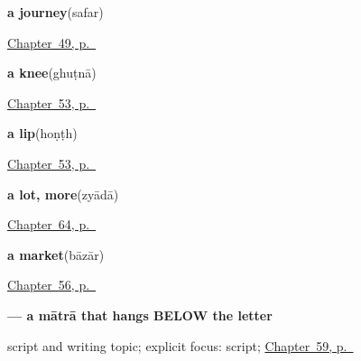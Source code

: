 \noindent\begin{minipage}[t]{\linewidth}
\raggedright
\textbf{a journey}\enspace\emph{}\enspace(safar)\par
\footnotesize \hyperref[ch:hi-taking-leave]{Chapter~49, p.~\pageref*{ch:hi-taking-leave}}
\end{minipage}\par\smallskip

\noindent\begin{minipage}[t]{\linewidth}
\raggedright
\textbf{a knee}\enspace\emph{}\enspace(ghuṭnā)\par
\footnotesize \hyperref[ch:hi-more-of-the-body]{Chapter~53, p.~\pageref*{ch:hi-more-of-the-body}}
\end{minipage}\par\smallskip

\noindent\begin{minipage}[t]{\linewidth}
\raggedright
\textbf{a lip}\enspace\emph{}\enspace(hoṇṭh)\par
\footnotesize \hyperref[ch:hi-more-of-the-body]{Chapter~53, p.~\pageref*{ch:hi-more-of-the-body}}
\end{minipage}\par\smallskip

\noindent\begin{minipage}[t]{\linewidth}
\raggedright
\textbf{a lot, more}\enspace\emph{}\enspace(zyādā)\par
\footnotesize \hyperref[ch:hi-how-much-and-how-fast]{Chapter~64, p.~\pageref*{ch:hi-how-much-and-how-fast}}
\end{minipage}\par\smallskip

\noindent\begin{minipage}[t]{\linewidth}
\raggedright
\textbf{a market}\enspace\emph{}\enspace(bāzār)\par
\footnotesize \hyperref[ch:hi-the-road]{Chapter~56, p.~\pageref*{ch:hi-the-road}}
\end{minipage}\par\smallskip

\noindent\begin{minipage}[t]{\linewidth}
\raggedright
\textbf{ — a mātrā that hangs BELOW the letter}\par
\footnotesize script and writing topic; explicit focus: script; \hyperref[ch:hi-script-second-wave]{Chapter~59, p.~\pageref*{ch:hi-script-second-wave}}
\end{minipage}\par\smallskip

